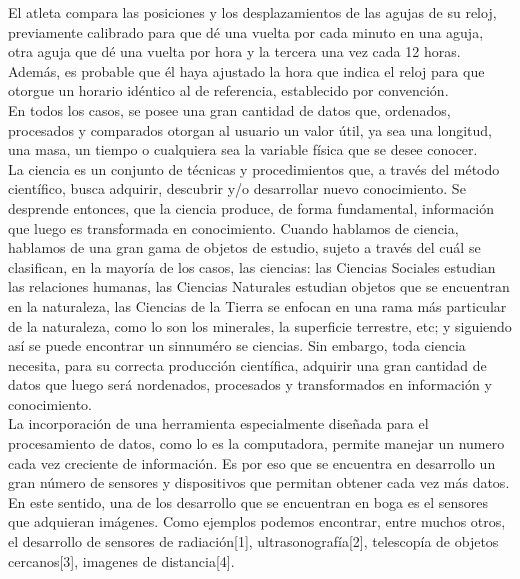 El atleta compara las posiciones y los desplazamientos de las agujas de su reloj, previamente calibrado para que dé una vuelta por cada minuto en una aguja, otra aguja que dé una vuelta por hora y la tercera una vez cada 12 horas. Además, es probable que él haya ajustado la hora que indica el reloj para que otorgue un horario idéntico al de referencia, establecido por convención.\\

En todos los casos, se posee una gran cantidad de datos que, ordenados, procesados y comparados otorgan al usuario un valor útil, ya sea una longitud, una masa, un tiempo o cualquiera sea la variable física que se desee conocer.\\

La ciencia es un conjunto de técnicas y procedimientos que, a través del método científico, busca adquirir, descubrir y/o desarrollar nuevo conocimiento. Se desprende entonces, que la ciencia produce, de forma fundamental, información que luego es transformada en conocimiento. Cuando hablamos de ciencia, hablamos de una gran gama de objetos de estudio, sujeto a través del cuál se clasifican, en la mayoría de los casos, las ciencias: las Ciencias Sociales estudian las relaciones humanas, las Ciencias Naturales estudian objetos que se encuentran en la naturaleza, las Ciencias de la Tierra se enfocan en una rama más particular de la naturaleza, como lo son los minerales, la superficie terrestre, etc; y siguiendo así se puede encontrar un sinnuméro se ciencias. Sin embargo, toda ciencia necesita, para su correcta producción científica, adquirir una gran cantidad de datos que luego será nordenados, procesados y transformados en información y conocimiento.\\

La incorporación de una herramienta especialmente diseñada para el procesamiento de datos, como lo es la computadora, permite manejar un numero cada vez creciente de información.
Es por eso que se encuentra en desarrollo un gran número de sensores y dispositivos que permitan obtener cada vez más datos.\\

En este sentido, una de los desarrollo que se encuentran en boga es el sensores que adquieran imágenes. Como ejemplos podemos encontrar, entre muchos otros, el desarrollo de sensores de radiación[1], ultrasonografía[2], telescopía de objetos cercanos[3], imagenes de distancia[4].





